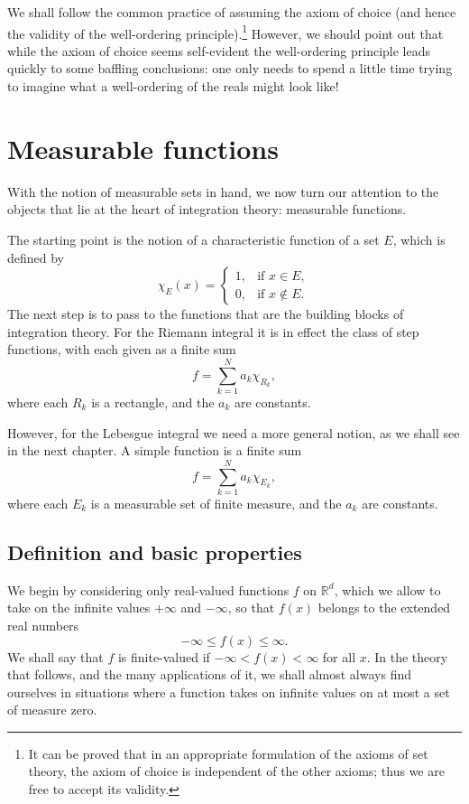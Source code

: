 \documentclass[11pt,openany]{book}
\begin{document}
We shall follow the common practice of assuming the axiom of choice (and hence the validity of the well-ordering principle).\footnote{It can be proved that in an appropriate formulation of the axioms of set theory, the axiom of choice is independent of the other axioms; thus we are free to accept its validity.} However, we should point out that while the axiom of choice seems self-evident the well-ordering principle leads quickly to some baffling conclusions: one only needs to spend a little time trying to imagine what a well-ordering of the reals might look like!

\section{Measurable functions}

With the notion of measurable sets in hand, we now turn our attention to the objects that lie at the heart of integration theory: measurable functions.

The starting point is the notion of a characteristic function of a set $E$, which is defined by
\[
 \chi_E(x)=
 \begin{cases}
 1,&\text{if }x\in E,\\
 0,&\text{if }x\notin E.
 \end{cases}
\]
The next step is to pass to the functions that are the building blocks of integration theory. For the Riemann integral it is in effect the class of step functions, with each given as a finite sum
\begin{equation}
 f=\sum_{k=1}^N a_k\chi_{R_k},
 \tag{5}
\end{equation}
where each $R_k$ is a rectangle, and the $a_k$ are constants.

However, for the Lebesgue integral we need a more general notion, as we shall see in the next chapter. A simple function is a finite sum
\begin{equation}
 f=\sum_{k=1}^N a_k\chi_{E_k},
 \tag{6}
\end{equation}
where each $E_k$ is a measurable set of finite measure, and the $a_k$ are constants.

\subsection{Definition and basic properties}

We begin by considering only real-valued functions $f$ on $\mathbb{R}^d$, which we allow to take on the infinite values $+\infty$ and $-\infty$, so that $f(x)$ belongs to the extended real numbers
\[
 -\infty\le f(x)\le\infty.
\]
We shall say that $f$ is finite-valued if $-\infty<f(x)<\infty$ for all $x$. In the theory that follows, and the many applications of it, we shall almost always find ourselves in situations where a function takes on infinite values on at most a set of measure zero.
\end{document}

